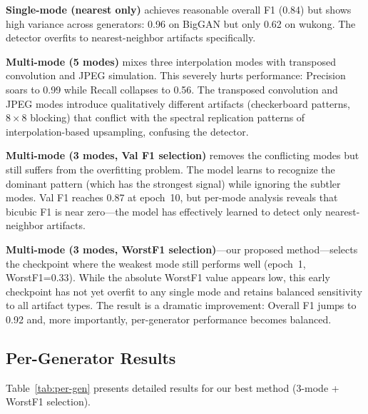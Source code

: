 \documentclass[11pt,a4paper]{article}
\begin{document}
\textbf{Single-mode (nearest only)} achieves reasonable overall F1 (0.84) but shows high variance across generators: 0.96 on BigGAN but only 0.62 on wukong. The detector overfits to nearest-neighbor artifacts specifically.

\textbf{Multi-mode (5 modes)} mixes three interpolation modes with transposed convolution and JPEG simulation. This severely hurts performance: Precision soars to 0.99 while Recall collapses to 0.56. The transposed convolution and JPEG modes introduce qualitatively different artifacts (checkerboard patterns, $8 \times 8$ blocking) that conflict with the spectral replication patterns of interpolation-based upsampling, confusing the detector.

\textbf{Multi-mode (3 modes, Val F1 selection)} removes the conflicting modes but still suffers from the overfitting problem. The model learns to recognize the dominant pattern (which has the strongest signal) while ignoring the subtler modes. Val F1 reaches 0.87 at epoch~10, but per-mode analysis reveals that bicubic F1 is near zero---the model has effectively learned to detect only nearest-neighbor artifacts.

\textbf{Multi-mode (3 modes, WorstF1 selection)}---our proposed method---selects the checkpoint where the weakest mode still performs well (epoch~1, WorstF1=0.33). While the absolute WorstF1 value appears low, this early checkpoint has not yet overfit to any single mode and retains balanced sensitivity to all artifact types. The result is a dramatic improvement: Overall F1 jumps to 0.92 and, more importantly, per-generator performance becomes balanced.

\subsection{Per-Generator Results}

Table~\ref{tab:per-gen} presents detailed results for our best method (3-mode + WorstF1 selection).
\end{document}
